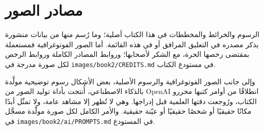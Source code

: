\chapter*{مصادر الصور}

الرسوم والخرائط والمخططات في هذا الكتاب أصلية؛ وما رُسم منها من بيانات
منشورة يذكر مصدره في التعليق المرافق أو في هذه القائمة. أما الصور
الفوتوغرافية فمستعملة بمقتضى رخصها الحرة، مع الشكر لأصحابها؛ وروابط المصادر
الكاملة وروابط الرخص لكل صورة مدرجة في \texttt{images/book2/CREDITS.md} في
مستودع الكتاب.

\bigskip
وإلى جانب الصور الفوتوغرافية والرسوم الأصلية، بعض الأشكال رسوم توضيحية
مولَّدة بالذكاء الاصطناعي، أُنتجت بأداة توليد الصور من OpenAI انطلاقًا من
أوامر كتبها محررو الكتاب، ورُوجعت دقتها العلمية قبل إدراجها. وهي لا تُظهر
إلا مشاهد عامة، ولا تمثّل أبدًا مكانًا حقيقيًا أو شخصًا حقيقيًا أو عيّنة
حقيقية. والأمر الكامل لكل صورة مولَّدة مسجَّل في
\texttt{images/book2/ai/PROMPTS.md} في المستودع.

